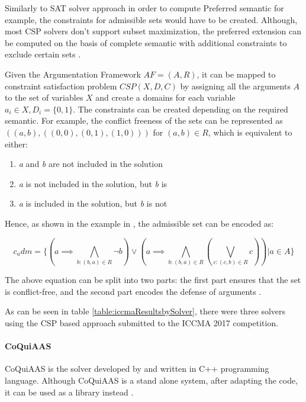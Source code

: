 Similarly to SAT solver approach in order to compute Preferred semantic for example, the constraints for admissible sets would have to be created. Although, most CSP solvers don't support subset maximization, the preferred extension can be computed on the basis of complete semantic with additional constraints to exclude certain sets \citep{solvingMethods}.

Given the Argumentation Framework $ AF = (A,R)$, it can be mapped to constraint satisfaction problem $ CSP(X,D,C) $ by assigning all the arguments $A$ to the set of variables $X$ and create a domains for each variable $ a_i \in X, D_i = \{0,1\} $. The constraints can be created depending on the required semantic. For example, the conflict freeness of the sets can be represented as $((a,b),((0,0), (0,1),(1,0)))$ for $(a,b) \in R$, which is equivalent to either:
\begin{enumerate}
	\item \textit{a} and \textit{b} are not included in the solution
	\item \textit{a} is not included in the solution, but \textit{b} is
	\item \textit{a} is included in the solution, but \textit{b} is not
\end{enumerate}

Hence, as shown in the example in \citet{solvingMethods}, the admissible set can be encoded as:

\begin{equation}
c_adm = \{(a \implies \bigwedge\limits_{ b : (b,a) \in R } \neg  b) \lor (a \implies \bigwedge\limits_{b:(b,a) \in R} (\bigvee\limits_{c:(c,b) \in R} c) ) | a \in A\}
\end{equation}

The above equation can be split into two parts: the first part ensures that the set is conflict-free, and the second part encodes the defense of arguments \citep{csp2}. 

As can be seen in table \ref{table:iccmaResultsbySolver}, there were three solvers using the CSP based approach submitted to the ICCMA 2017 competition. 

\paragraph{CoQuiAAS}
CoQuiAAS is the solver developed by \citet{coquiaas} and written in C++ programming language. Although CoQuiAAS is a stand alone system, after adapting the code, it can be used as a library instead \citep{coquiaas}.

